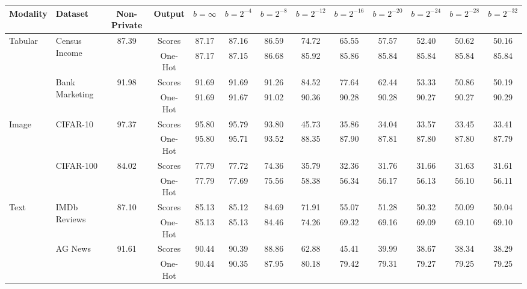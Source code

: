 \begin{tabular}{llccccccccccc}
\toprule
Modality & Dataset & Non-Private & Output & $b=\infty$ & $b=2^{-4}$ & $b=2^{-8}$ & $b=2^{-12}$ & $b=2^{-16}$ & $b=2^{-20}$ & $b=2^{-24}$ & $b=2^{-28}$ & $b=2^{-32}$ \\
\midrule
\multirow{4.5}{*}{Tabular} & \multirow{2}{*}{Census Income} & \multirow{2}{*}{87.39} & Scores & 87.17 & 87.16 & 86.59 & 74.72 & 65.55 & 57.57 & 52.40 & 50.62 & 50.16 \\
 &  &  & One-Hot & 87.17 & 87.15 & 86.68 & 85.92 & 85.86 & 85.84 & 85.84 & 85.84 & 85.84 \\
\cmidrule{2-13}
 & \multirow{2}{*}{Bank Marketing} & \multirow{2}{*}{91.98} & Scores & 91.69 & 91.69 & 91.26 & 84.52 & 77.64 & 62.44 & 53.33 & 50.86 & 50.19 \\
 &  &  & One-Hot & 91.69 & 91.67 & 91.02 & 90.36 & 90.28 & 90.28 & 90.27 & 90.27 & 90.29 \\
\midrule
\multirow{4}{*}{Image} & \multirow{2}{*}{CIFAR-10} & \multirow{2}{*}{97.37} & Scores & 95.80 & 95.79 & 93.80 & 45.73 & 35.86 & 34.04 & 33.57 & 33.45 & 33.41 \\
 &  &  & One-Hot & 95.80 & 95.71 & 93.52 & 88.35 & 87.90 & 87.81 & 87.80 & 87.80 & 87.79 \\
\cmidrule{2-13}
 & \multirow{2}{*}{CIFAR-100} & \multirow{2}{*}{84.02} & Scores & 77.79 & 77.72 & 74.36 & 35.79 & 32.36 & 31.76 & 31.66 & 31.63 & 31.61 \\
 &  &  & One-Hot & 77.79 & 77.69 & 75.56 & 58.38 & 56.34 & 56.17 & 56.13 & 56.10 & 56.11 \\
\midrule
\multirow{4}{*}{Text} & \multirow{2}{*}{IMDb Reviews} & \multirow{2}{*}{87.10} & Scores & 85.13 & 85.12 & 84.69 & 71.91 & 55.07 & 51.28 & 50.32 & 50.09 & 50.04 \\
 &  &  & One-Hot & 85.13 & 85.13 & 84.46 & 74.26 & 69.32 & 69.16 & 69.09 & 69.10 & 69.10 \\
\cmidrule{2-13}
 & \multirow{2}{*}{AG News} & \multirow{2}{*}{91.61} & Scores & 90.44 & 90.39 & 88.86 & 62.88 & 45.41 & 39.99 & 38.67 & 38.34 & 38.29 \\
 &  &  & One-Hot & 90.44 & 90.35 & 87.95 & 80.18 & 79.42 & 79.31 & 79.27 & 79.25 & 79.25 \\
\bottomrule
\end{tabular}
